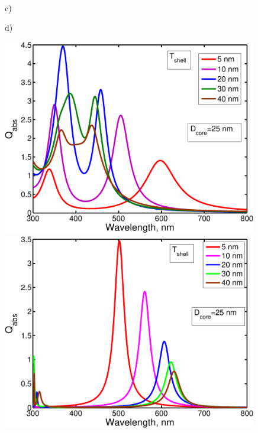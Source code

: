 \documentclass[aip,jap,reprint]{revtex4-1}
\begin{document}
\begin{figure}
\begin{minipage}[h]{0.235\textwidth}
  \end{minipage}\\
  \vspace{4pt}
  \begin{minipage}[h]{0.235\textwidth}
    \begin{flushleft}
      c)
    \end{flushleft}
  \end{minipage}
  \hfill
  \begin{minipage}[h]{0.235\textwidth}
    \begin{flushleft}
      d)
    \end{flushleft}
  \end{minipage}
  \begin{minipage}[h]{0.235\textwidth}
    \includegraphics[width=0.99\textwidth]{Qabs_core_25nm}
  \end{minipage}
  \hfill
  \begin{minipage}[h]{0.235\textwidth}
    \includegraphics[width=0.99\textwidth]{Qabs_Ag_TiO_25_t}

\end{minipage}
\end{figure}
\end{document}
